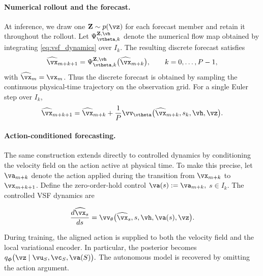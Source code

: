\paragraph{Numerical rollout and the forecast.}
At inference, we draw one
$\mathbf{Z}\sim p(\vz)$
for each forecast member and retain it throughout the rollout.  Let
$\Psi_{\vtheta,k}^{\mathbf{Z},\vh}$ denote the numerical
flow map obtained by integrating \eqref{eq:vsf_dynamics} over
$I_k$.  The resulting discrete forecast satisfies
\begin{equation}
\widehat{\vx}_{m+k+1}
=
\Psi_{\vtheta,k}^{\mathbf{Z},\vh}
\bigl(
\widehat{\vx}_{m+k}
\bigr),
\qquad
k=0,\ldots,P-1,
\label{eq:vsf_discrete_flow_map}
\end{equation}
with $\widehat{\vx}_m=\vx_m$.  Thus the discrete forecast is
obtained by sampling the continuous physical-time trajectory on the
observation grid.
For a single Euler step over $I_k$,
\begin{equation}
\widehat{\vx}_{m+k+1}
=
\widehat{\vx}_{m+k}
+
\frac{1}{P}
\vv_{\vtheta}
\bigl(
\widehat{\vx}_{m+k},
s_k,
\vh,
\vz
\bigr).
\label{eq:vsf_euler_realization}
\end{equation}

\paragraph{Action-conditioned forecasting.} The same construction extends directly to controlled dynamics by conditioning the velocity field on the action active at physical time. To make this precise, let $\va_{m+k}$ denote the action applied
during the transition from $\vx_{m+k}$ to
$\vx_{m+k+1}$.  Define the zero-order-hold control
$\va(s)
:=
\va_{m+k},$
$s\in I_k.$
The controlled VSF dynamics are

\begin{equation}
\frac{d\widehat{\vx}_s}{ds}
=
\vv_{{\theta}}
\bigl(
\widehat{\vx}_s,
s,
\vh,
\va(s),
\vz
\bigr).
\label{eq:vsf_action_conditioned_dynamics}
\end{equation}

During training, the aligned action is supplied to both the velocity field
and the local variational encoder.  In particular, the posterior becomes $q_{\boldsymbol{\phi}}
\bigl(
\vz
\mid
\vu_S,
\vc_S,
\va(S)
\bigr).$
The autonomous model is recovered by omitting the action argument.




